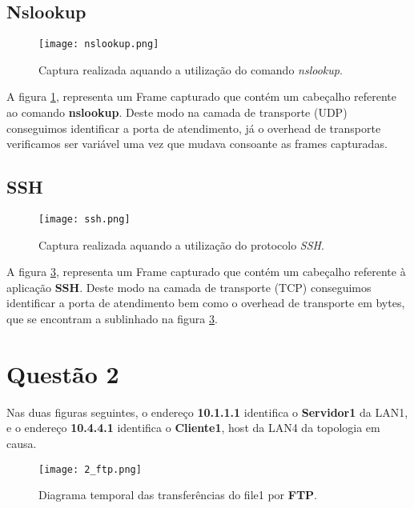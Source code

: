 \documentclass{llncs}
\begin{document}
\subsection{Nslookup}

\begin{figure}[H]
\begin{center}
\texttt{[image: nslookup.png]}
\end{center}
\caption{\label{fig:nslook}Captura realizada aquando a utilização do comando \emph{nslookup}.}
\end{figure}

A figura \ref{fig:nslook}, representa um Frame capturado que contém um cabeçalho referente ao comando \textbf{nslookup}. Deste modo na camada de transporte (UDP) conseguimos identificar a porta de atendimento, já o overhead de transporte verificamos ser variável uma vez que mudava consoante as frames capturadas.



\subsection{SSH}

\begin{figure}[H]
\begin{center}
\texttt{[image: ssh.png]}
\end{center}
\caption{\label{fig:ssh}Captura realizada aquando a utilização do protocolo \emph{SSH}.}
\end{figure}

A figura \ref{fig:ssh}, representa um Frame capturado que contém um cabeçalho referente à aplicação \textbf{SSH}. Deste modo na camada de transporte (TCP) conseguimos identificar a porta de atendimento bem como o overhead de transporte em bytes, que se encontram a sublinhado na figura \ref{fig:ssh}.


\newpage

\section{Questão 2}

Nas duas figuras seguintes, o endereço \textbf{10.1.1.1} identifica o \textbf{Servidor1} da LAN1, e o endereço \textbf{10.4.4.1} identifica o \textbf{Cliente1}, host da LAN4 da topologia em causa.

\begin{figure}[H]
\begin{center}
\texttt{[image: 2\_ftp.png]}
\end{center}
\caption{\label{fig:ssh}Diagrama temporal das transferências do file1 por \textbf{FTP}.}
\end{figure}
\end{document}
